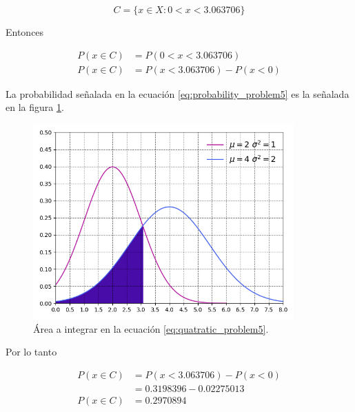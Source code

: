 \begin{equation*}
    C=\{x\in X : 0<x<3.063706\}
\end{equation*}

Entonces

\begin{align}
    P(x\in C) & = P(0<x<3.063706)                                        \\
    P(x\in C) & = P(x<3.063706) - P(x<0) \label{eq:probability_problem5}
\end{align}

La probabilidad señalada en la ecuación \ref{eq:probability_problem5} es la señalada en la figura \ref{fig:probability_problem5}.

\begin{figure}[H]
    \centering
    \includegraphics[width=10cm]{Graphics/problem5.png}
    \caption{Área a integrar en la ecuación \ref{eq:quatratic_problem5}.}
    \label{fig:probability_problem5}
\end{figure}

Por lo tanto

\begin{align*}
    P(x\in C) & = P(x<3.063706) - P(x<0) \\
              & = 0.3198396 - 0.02275013 \\
    P(x\in C) & = 0.2970894
\end{align*}